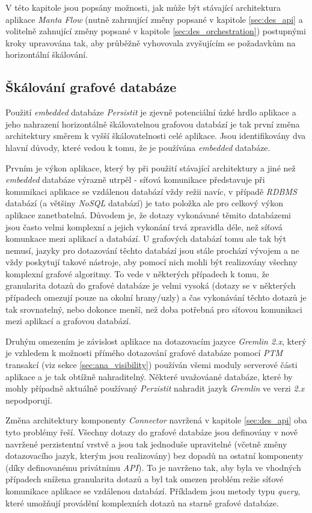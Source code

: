 V této kapitole jsou popsány možnosti, jak může být stávající architektura aplikace \textit{Manta Flow} (nutně zahrnující změny popsané v kapitole \ref{sec:des_api} a volitelně zahnující změny popsané v kapitole \ref{sec:des_orchestration}) postupnými kroky upravována tak, aby průběžně vyhovovala zvyšujícím se požadavkům na horizontální škálování.


\subsection{Škálování grafové databáze}
\label{sec:des_scaling_db}
Použití \textit{embedded} databáze \textit{Persistit} je zjevně potenciální úzké hrdlo aplikace a jeho nahrazení horizontálně škálovatelnou grafovou databází je tak první změna architektury směrem k vyšší škálovatelnosti celé aplikace. Jsou identifikovány dva hlavní důvody, které vedou k tomu, že je používána \textit{embedded} databáze.

Prvním je výkon aplikace, který by při použití stávající architektury a jiné než \textit{embedded} databáze výrazně utrpěl - síťová komunikace představuje při komunikaci aplikace se vzdálenou databází vždy režii navíc, v případě \textit{RDBMS} databází (a většiny \textit{NoSQL} databází) je tato položka ale pro celkový výkon aplikace zanetbatelná. Důvodem je, že dotazy vykonávané těmito databázemi jsou často velmi komplexní a jejich vykonání trvá zpravidla déle, než síťová komunkace mezi aplikací a databází. U grafových databází tomu ale tak být nemusí, jazyky pro dotazování těchto databází jsou stále prochází vývojem a ne vždy poskytují takové nástroje, aby pomocí nich mohli být realizovány všechny komplexní grafové algoritmy. To vede v některých případech k tomu, že granularita dotazů do grafové databáze je velmi vysoká (dotazy se v některých případech omezují pouze na okolní hrany/uzly) a čas vykonávání těchto dotazů je tak srovnatelný, nebo dokonce menší, než doba potřebná pro síťovou komunikaci mezi aplikací a grafovou databází.

Druhým omezením je závislost aplikace na dotazovacím jazyce \textit{Gremlin 2.x}, který je vzhledem k možnosti přímého dotazování grafové databáze pomocí \textit{PTM} transakcí (viz sekce \ref{sec:ana_visibility}) používán všemi moduly serverové části aplikace a je tak obtížně nahraditelný. Některé uvažováané databáze, které by mohly případně aktuálně používaný \textit{Perzistit} nahradit jazyk \textit{Gremlin} ve verzi \textit{2.x} nepodporují.

Změna architektury komponenty \textit{Connector} navržená v kapitole \ref{sec:des_api} oba tyto problémy řeší. Všechny dotazy do grafové databáze jsou definovány v nově navržené perzistentní vrstvě a jsou tak jednoduše upravitelné (včetně změny dotazovacího jazyk, kterým jsou realizovány) bez dopadů na ostatní komponenty (díky definovanému privátnímu \textit{API}). To je navrženo tak, aby byla ve vhodných případech snížena granularita dotazů a byl tak omezen problém režie síťové komunikace aplikace se vzdálenou databází. Příkladem jsou metody typu \textit{query}, které umožňují provádění komplexních dotazů na starně grafové databáze.

